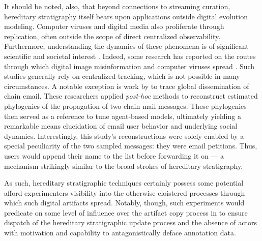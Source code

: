 It should be noted, also, that beyond connections to streaming curation, hereditary stratigraphy itself bears upon applications outside digital evolution modeling.
Computer viruses and digital media also proliferate through replication, often outside the scope of direct centralized observability.
Furthermore, understanding the dynamics of these phenomena is of significant scientific and societal interest \citep{aslan2020comprehensive,dupuis2019spread,ling2021dissecting}.
Indeed, some research has reported on the routes through which digital image misinformation and computer viruses spread \citep{friggeri2014rumor,cohen1987computer}.
Such studies generally rely on centralized tracking, which is not possible in many circumstances.
A notable exception is work by \cite{libennowell2008tracing} to trace global dissemination of chain email.
These researchers applied \textit{post-hoc} methods to reconstruct estimated phylogenies of the propagation of two chain mail messages.
These phylogenies then served as a reference to tune agent-based models, ultimately yielding a remarkable means elucidation of email user behavior and underlying social dynamics.
Interestingly, this study's reconstructions were solely enabled by a special peculiarity of the two sampled messages: they were email petitions.
Thus, users would append their name to the list before forwarding it on --- a mechanism strikingly similar to the broad strokes of hereditary stratigraphy.

As such, hereditary stratigraphic techniques certainly possess some potential afford experimenters visibility into the otherwise cloistered processes through which such digital artifacts spread.
Notably, though, such experiments would predicate on some level of influence over the artifact copy process in to ensure dispatch of the hereditary stratigraphic update process and the absence of actors with motivation and capability to antagonistically deface annotation data.


